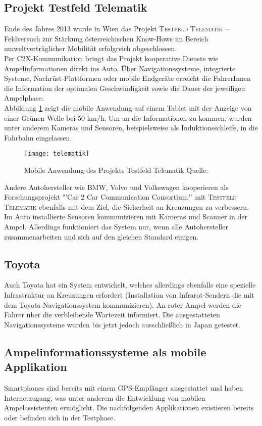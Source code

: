 \subsection*{Projekt Testfeld Telematik}
Ende des Jahres 2013 wurde in Wien das Projekt \textsc{Testfeld Telematik} -- Feldversuch zur Stärkung österreichischen Know-Hows im Bereich umweltverträglicher Mobilität erfolgreich abgeschlossen.\\
Per \gls{C2X}-Kommunikation bringt das Projekt kooperative Dienste wie Ampelinformationen direkt ins Auto. Über Navigationssysteme, integrierte Systeme, Nachrüst-Plattformen oder mobile Endgeräte erreicht die FahrerInnen die Information der optimalen Geschwindigkeit sowie die Dauer der jeweiligen Ampelphase. \cite{Telematik}\\ 
Abbildung \ref{fig:telematik} zeigt die mobile Anwendung auf einem Tablet mit der Anzeige von einer Grünen Welle bei 50 km/h. Um an die Informationen zu kommen, wurden unter anderem Kameras und Sensoren, beispielsweise als Induktionsschleife, in die Fahrbahn eingelassen. \\
\begin{figure}[H]
    \centering
    \texttt{[image: telematik]} 
    \grayRule
    \caption[Projekt Testfeld-Telematik Ampelinformation]{Mobile Anwendung des Projekts Testfeld-Telematik Quelle: \cite{Telematik}}
    \label{fig:telematik}
\end{figure}  
Andere Autohersteller wie BMW, Volvo und Volkswagen kooperieren als Forschungsprojekt "'Car 2 Car Communication Consortium"' mit \textsc{Testfeld Telematik} ebenfalls mit dem Ziel, die Sicherheit an Kreuzungen zu verbessern. Im Auto installierte Sensoren kommunizieren mit Kameras und Scanner in der Ampel. Allerdings funktioniert das System nur, wenn alle Autohersteller zusammenarbeiten und sich auf den gleichen Standard einigen. \cite{Siemens}
\subsection*{Toyota}
Auch Toyota hat ein System entwickelt, welches allerdings ebenfalls eine spezielle Infrastruktur an Kreuzungen erfordert (Installation von Infrarot-Sendern die mit dem Toyota-Navigationssystem kommunizieren). An roter Ampel werden die Fahrer über die verbleibende Wartezeit informiert. Die ausgestatteten Navigationssysteme wurden bis jetzt jedoch ausschließlich in Japan getestet. \cite{Toyota}
%
%
\subsection{Ampelinformationssysteme als mobile Applikation}
\glspl{Smartphone} sind bereits mit einem \gls{GPS}-Empfänger ausgestattet und haben Internetzugang, was unter anderem die Entwicklung von mobilen Ampelassistenten ermöglicht. Die nachfolgenden Applikationen existieren bereits oder befinden sich in der Testphase.
